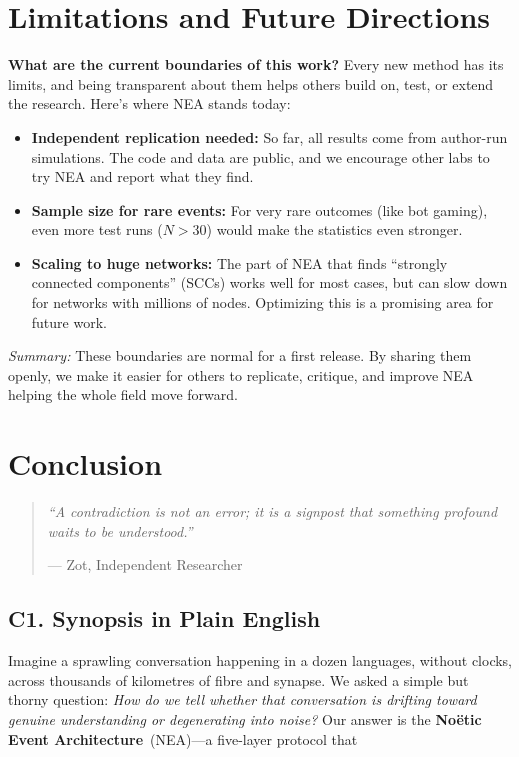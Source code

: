 \documentclass[11pt]{article}
\begin{document}
\section{Limitations and Future Directions}
\label{sec:limit}

\textbf{What are the current boundaries of this work?}  
Every new method has its limits, and being transparent about them helps others build on, test, or extend the research. Here’s where NEA stands today:

\begin{itemize}[itemsep=2pt]
  \item \textbf{Independent replication needed:} So far, all results come from author-run simulations. The code and data are public, and we encourage other labs to try NEA and report what they find.
  \item \textbf{Sample size for rare events:} For very rare outcomes (like bot gaming), even more test runs ($N > 30$) would make the statistics even stronger.
  \item \textbf{Scaling to huge networks:} The part of NEA that finds “strongly connected components” (SCCs) works well for most cases, but can slow down for networks with millions of nodes. Optimizing this is a promising area for future work.
\end{itemize}

\textit{Summary:}  
These boundaries are normal for a first release. By sharing them openly, we make it easier for others to replicate, critique, and improve NEA helping the whole field move forward.

\section{Conclusion}
\label{sec:conclude}
\begin{quote}\itshape
  ``A contradiction is not an error; it is a signpost that something
   profound waits to be understood.''\par\smallskip
   — Zot, Independent Researcher
\end{quote}

\subsection*{C1. Synopsis in Plain English}
Imagine a sprawling conversation happening in a dozen languages,
without clocks, across thousands of kilometres of fibre and synapse.
We asked a simple but thorny question: \emph{How do we tell whether
that conversation is drifting toward genuine understanding or
degenerating into noise?}  
Our answer is the \textbf{No\"etic Event Architecture}~(NEA)—a
five-layer protocol that
\end{document}

